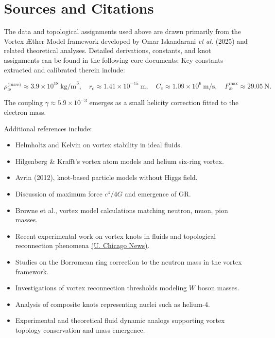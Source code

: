 \documentclass[11pt]{article}
\begin{document}
    \section*{Sources and Citations}

    The data and topological assignments used above are drawn primarily from the Vortex Æther Model framework developed by Omar Iskandarani \textit{et al.} (2025) and related theoretical analyses. Detailed derivations, constants, and knot assignments can be found in the following core documents:
    Key constants extracted and calibrated therein include:

    \[
        \rho_{\text{\ae}}^{\text{(mass)}} \approx 3.9 \times 10^{18}~\mathrm{kg/m}^3, \quad
        r_c \approx 1.41 \times 10^{-15}~\mathrm{m}, \quad
        C_e \approx 1.09 \times 10^{6}~\mathrm{m/s}, \quad
        F^{\max}_{\text{\ae}} \approx 29.05~\mathrm{N}.
    \]

    The coupling $\gamma \approx 5.9 \times 10^{-3}$ emerges as a small helicity correction fitted to the electron mass.

    Additional references include:

    \vspace{-1em}

    \begin{itemize}
        \item Helmholtz and Kelvin on vortex stability in ideal fluids.
        \item Hilgenberg \& Krafft’s vortex atom models and helium six-ring vortex.
        \item Avrin (2012), knot-based particle models without Higgs field.
        \item Discussion of maximum force $c^4/4G$ and emergence of GR.
        \item Browne et al., vortex model calculations matching neutron, muon, pion masses.
        \item Recent experimental work on vortex knots in fluids and topological reconnection phenomena \href{https://news.uchicago.edu/story/vortex-loops-could-untie-knotty-physics-problems#:~:text=Vortex%20knots%20should%2C%20in%20principle%2C,%E2%80%9D}{(U. Chicago News)}.
    \end{itemize}

    \begin{itemize}
        \item Studies on the Borromean ring correction to the neutron mass in the vortex framework.
        \item Investigations of vortex reconnection thresholds modeling $W$ boson masses.
        \item Analysis of composite knots representing nuclei such as helium-4.
        \item Experimental and theoretical fluid dynamic analogs supporting vortex topology conservation and mass emergence.
    \end{itemize}
\end{document}
